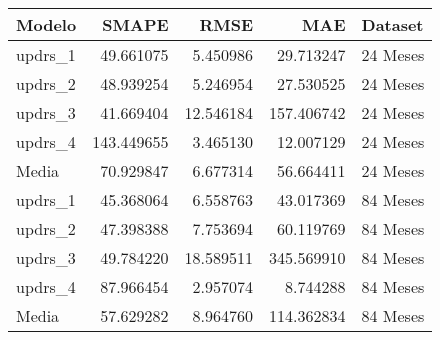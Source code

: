\begin{tabular}{lrrrl}
\toprule
Modelo & SMAPE & RMSE & MAE & Dataset \\
\midrule
updrs_1 & 49.661075 & 5.450986 & 29.713247 & 24 Meses \\
updrs_2 & 48.939254 & 5.246954 & 27.530525 & 24 Meses \\
updrs_3 & 41.669404 & 12.546184 & 157.406742 & 24 Meses \\
updrs_4 & 143.449655 & 3.465130 & 12.007129 & 24 Meses \\
Media & 70.929847 & 6.677314 & 56.664411 & 24 Meses \\
updrs_1 & 45.368064 & 6.558763 & 43.017369 & 84 Meses \\
updrs_2 & 47.398388 & 7.753694 & 60.119769 & 84 Meses \\
updrs_3 & 49.784220 & 18.589511 & 345.569910 & 84 Meses \\
updrs_4 & 87.966454 & 2.957074 & 8.744288 & 84 Meses \\
Media & 57.629282 & 8.964760 & 114.362834 & 84 Meses \\
\bottomrule
\end{tabular}
